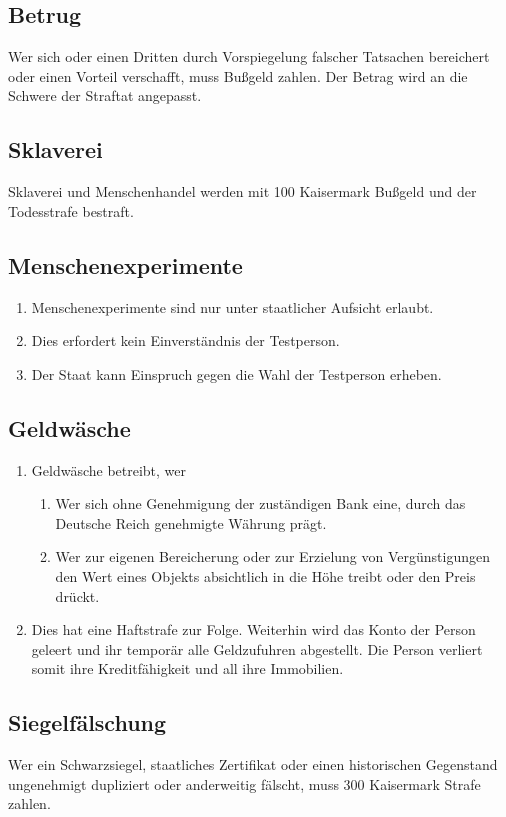 \documentclass{article}
\begin{document}
\subsection{Betrug}
Wer sich oder einen Dritten durch Vorspiegelung falscher Tatsachen bereichert oder einen Vorteil verschafft, muss Bußgeld zahlen. Der Betrag wird an die Schwere der Straftat angepasst.

\subsection{Sklaverei}
Sklaverei und Menschenhandel werden mit 100 Kaisermark Bußgeld und der Todesstrafe bestraft.

\subsection{Menschenexperimente}
\begin{enumerate}[(1)]
    \item Menschenexperimente sind nur unter staatlicher Aufsicht erlaubt.
    \item Dies erfordert kein Einverständnis der Testperson.
    \item Der Staat kann Einspruch gegen die Wahl der Testperson erheben.
\end{enumerate}

\subsection{Geldwäsche}
\begin{enumerate}[(1)]
    \item Geldwäsche betreibt, wer
    \begin{enumerate}[1.]
        \item Wer sich ohne Genehmigung der zuständigen Bank eine, durch das Deutsche Reich genehmigte Währung prägt.
        \item Wer zur eigenen Bereicherung oder zur Erzielung von Vergünstigungen den Wert eines Objekts absichtlich in die Höhe treibt oder den Preis drückt. 
    \end{enumerate}
    \item Dies hat eine Haftstrafe zur Folge. Weiterhin wird das Konto der Person geleert und ihr temporär alle Geldzufuhren abgestellt. Die Person verliert somit ihre Kreditfähigkeit und all ihre Immobilien.
\end{enumerate}

\subsection{Siegelfälschung}
Wer ein Schwarzsiegel, staatliches Zertifikat oder einen historischen Gegenstand ungenehmigt dupliziert oder anderweitig fälscht, muss 300 Kaisermark Strafe zahlen.
\end{document}
